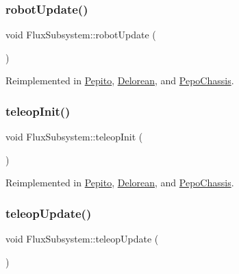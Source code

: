 \mbox{\label{classFluxSubsystem_ac2b1c08b53251870e945edf7080c1549}} 
\subsubsection{\texorpdfstring{robot\+Update()}{robotUpdate()}}
{\footnotesize\ttfamily void Flux\+Subsystem\+::robot\+Update (\begin{DoxyParamCaption}{ }\end{DoxyParamCaption})\hspace{0.3cm}{\ttfamily [virtual]}}



Reimplemented in \hyperlink{classPepito_a0894a64d02550bb35b4e3eefa3ac4934}{Pepito}, \hyperlink{classDelorean_a47b9cfdb59a6f46ee26f45f794e313c1}{Delorean}, and \hyperlink{classPepoChassis_acd6fa29da41ac5108af7e3a1f15218aa}{Pepo\+Chassis}.

\mbox{\label{classFluxSubsystem_aec6d05e4f80c3783684598fb92ad2e55}} 
\subsubsection{\texorpdfstring{teleop\+Init()}{teleopInit()}}
{\footnotesize\ttfamily void Flux\+Subsystem\+::teleop\+Init (\begin{DoxyParamCaption}{ }\end{DoxyParamCaption})\hspace{0.3cm}{\ttfamily [virtual]}}



Reimplemented in \hyperlink{classPepito_a5001bee2d7dcc225c87ac36d5eddc452}{Pepito}, \hyperlink{classDelorean_a789c6e4e70f4e2cfdf944d1a1a149509}{Delorean}, and \hyperlink{classPepoChassis_a44dbc37a56fe98d7b57af840e8da73b2}{Pepo\+Chassis}.

\mbox{\label{classFluxSubsystem_a327d76affc60699bfa62563e364e42f5}} 
\subsubsection{\texorpdfstring{teleop\+Update()}{teleopUpdate()}}
{\footnotesize\ttfamily void Flux\+Subsystem\+::teleop\+Update (\begin{DoxyParamCaption}{ }\end{DoxyParamCaption})\hspace{0.3cm}{\ttfamily [virtual]}}



